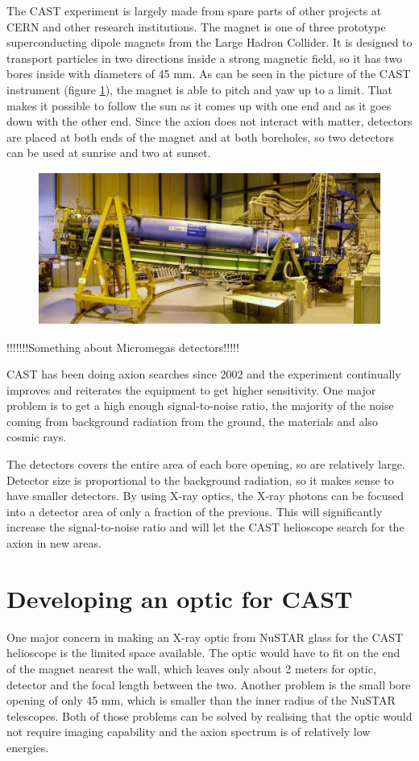 The CAST experiment is largely made from spare parts of other projects at CERN and other research institutions. The magnet is one of three prototype superconducting dipole magnets from the Large Hadron Collider. It is designed to transport particles in two directions inside a strong magnetic field, so it has two bores inside with diameters of 45 mm. As can be seen in the picture of the CAST instrument (figure \ref{fig:cast_instrument}), the magnet is able to pitch and yaw up to a limit. That makes it possible to follow the sun as it comes up with one end and as it goes down with the other end. Since the axion does not interact with matter, detectors are placed at both ends of the magnet and at both boreholes, so two detectors can be used at sunrise and two at sunset.

\begin{figure}[htbp]
  \centering
    \includegraphics[height=5cm]{figures/cast/cast_instrument.jpg}
  \caption{}
  \label{fig:cast_instrument}
\end{figure}

!!!!!!!Something about Micromegas detectors!!!!!

CAST has been doing axion searches since 2002 and the experiment continually improves and reiterates the equipment to get higher sensitivity. One major problem is to get a high enough signal-to-noise ratio, the majority of the noise coming from background radiation from the ground, the materials and also cosmic rays.

The detectors covers the entire area of each bore opening, so are relatively large. Detector size is proportional to the background radiation, so it makes sense to have smaller detectors. By using X-ray optics, the X-ray photons can be focused into a detector area of only a fraction of the previous. This will significantly increase the signal-to-noise ratio and will let the CAST helioscope search for the axion in new areas.

\section{Developing an optic for CAST}
One major concern in making an X-ray optic from NuSTAR glass for the CAST helioscope is the limited space available. The optic would have to fit on the end of the magnet nearest the wall, which leaves only about 2 meters for optic, detector and the focal length between the two. Another problem is the small bore opening of only 45 mm, which is smaller than the inner radius of the NuSTAR telescopes. Both of those problems can be solved by realising that the optic would not require imaging capability and the axion spectrum is of relatively low energies.

